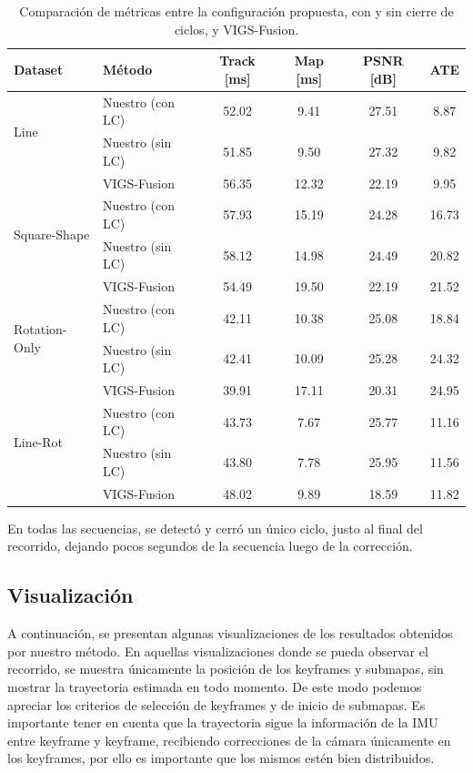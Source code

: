 \begin{table}[H]
\centering
\caption{Comparación de métricas entre la configuración propuesta, con y sin cierre de ciclos, y VIGS-Fusion.}
\label{tab:results_comparison}
\begin{tabular}{llcccc}
\hline
\textbf{Dataset} & \textbf{Método} & \textbf{Track [ms]} & \textbf{Map [ms]} & \textbf{PSNR [dB]} & \textbf{ATE} \\
\hline
\multirow{2}{*}{Line}
& Nuestro (con LC)       & 52.02 & 9.41 & 27.51 & 8.87 \\
& Nuestro (sin LC)       & 51.85 & 9.50 & 27.32 & 9.82 \\
& VIGS-Fusion            & 56.35  & 12.32 & 22.19& 9.95 \\
\hline

\multirow{2}{*}{Square-Shape}
& Nuestro (con LC)      & 57.93 & 15.19 & 24.28 & 16.73 \\
& Nuestro (sin LC)      & 58.12 & 14.98 & 24.49 & 20.82 \\
& VIGS-Fusion           & 54.49  & 19.50 & 22.19& 21.52     \\
\hline

\multirow{2}{*}{Rotation-Only}
& Nuestro (con LC)       & 42.11 & 10.38 & 25.08 & 18.84 \\
& Nuestro (sin LC)       & 42.41 & 10.09 & 25.28 & 24.32 \\
& VIGS-Fusion            & 39.91   & 17.11 & 20.31 & 24.95     \\
\hline

\multirow{2}{*}{Line-Rot}
& Nuestro (con LC)       & 43.73 & 7.67 & 25.77 & 11.16 \\
& Nuestro (sin LC)       & 43.80 & 7.78 & 25.95 & 11.56 \\
& VIGS-Fusion            & 48.02  & 9.89 & 18.59  & 11.82      \\
\hline

\end{tabular}
\end{table}

En todas las secuencias, se detectó y cerró un único ciclo, justo al final del recorrido, dejando pocos segundos de la secuencia luego de la corrección.

\subsection{Visualización}

A continuación, se presentan algunas visualizaciones de los resultados obtenidos por nuestro método. En aquellas visualizaciones donde se pueda observar el recorrido, se muestra únicamente la posición de los keyframes y submapas, sin mostrar la trayectoria estimada en todo momento. De este modo podemos apreciar los criterios de selección de keyframes y de inicio de submapas. Es importante tener en cuenta que la trayectoria sigue la información de la IMU entre keyframe y keyframe, recibiendo correcciones de la cámara únicamente en los keyframes, por ello es importante que los mismos estén bien distribuidos.

